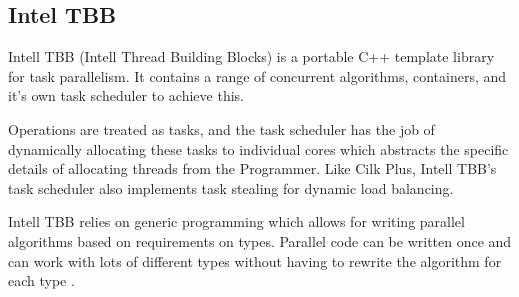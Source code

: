 \subsection{Intel TBB}

Intell TBB (Intell Thread Building Blocks) is a portable C++ template library for task parallelism.
It contains a range of concurrent algorithms, containers, and it's own task scheduler to achieve this\cite{tbb}.

Operations are treated as tasks, and the task scheduler has the job of dynamically allocating these tasks 
to individual cores which abstracts the specific details of allocating threads from the Programmer. Like Cilk Plus,
Intell TBB's task scheduler also implements task stealing for dynamic load balancing\cite{tbbschedule}.

Intell TBB relies on generic programming which allows for writing parallel algorithms based on 
requirements on types. Parallel code can be written once and can work with lots of different
types without having to rewrite the algorithm for each type \cite{tbbbenefits}.
